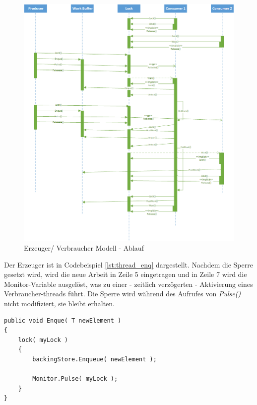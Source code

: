 \begin{figure}
	\centering
	\includegraphics[width=0.9\linewidth]{images/uml-sequence_pulse.png}
	\caption{Erzeuger/ Verbraucher Modell - Ablauf \cite[S. 405]{posa2} }
	\label{fig:threads_pcs}
\end{figure}

Der Erzeuger ist in Codebeispiel \ref{lst:thread_enq} dargestellt. Nachdem die Sperre gesetzt wird, wird die neue Arbeit in Zeile 5 eingetragen und in Zeile 7 wird die Monitor-Variable ausgelöst, was zu einer - zeitlich verzögerten - Aktivierung eines Verbraucher-threads führt. Die Sperre wird während des Aufrufes von \textit{Pulse()} nicht modifiziert, sie bleibt erhalten.
\begin{lstlisting}[caption={Thread Monitor.Pulse()},label={lst:thread_enq},captionpos=b]
public void Enque( T newElement )
{
	lock( myLock )
	{
		backingStore.Enqueue( newElement );

		Monitor.Pulse( myLock );
	}
}
\end{lstlisting}
